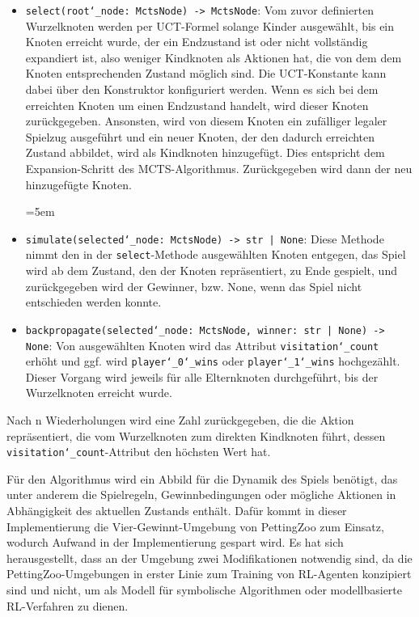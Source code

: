 \begin{itemize}
\item \texttt{select(root\char`_node: MctsNode) -> MctsNode}: Vom zuvor definierten Wurzelknoten werden per UCT-Formel solange Kinder ausgewählt, bis ein Knoten erreicht wurde, der ein Endzustand ist oder nicht vollständig expandiert ist, also weniger Kindknoten als Aktionen hat, die von dem dem Knoten entsprechenden Zustand möglich sind. Die UCT-Konstante kann dabei über den Konstruktor konfiguriert werden. Wenn es sich bei dem erreichten Knoten um einen Endzustand handelt, wird dieser Knoten zurückgegeben. Ansonsten, wird von diesem Knoten ein zufälliger legaler Spielzug ausgeführt und ein neuer Knoten, der den dadurch erreichten Zustand abbildet, wird als Kindknoten hinzugefügt. Dies entspricht dem Expansion-Schritt des MCTS-Algorithmus. Zurückgegeben wird dann der neu hinzugefügte Knoten.

\begingroup
\emergencystretch=5em
\item \texttt{simulate(selected\char`_node: MctsNode) -> str | None}: Diese Methode nimmt den in der \texttt{select}-Methode ausgewählten Knoten entgegen, das Spiel wird ab dem Zustand, den der Knoten repräsentiert, zu Ende gespielt, und zurückgegeben wird der Gewinner, bzw. None, wenn das Spiel nicht entschieden werden konnte.
\item \texttt{backpropagate(selected\char`_node: MctsNode, winner: str | None) -> None}: Von ausgewählten Knoten wird das Attribut \texttt{visitation\char`_count} erhöht und ggf. wird \texttt{player\char`_0\char`_wins} oder \texttt{player\char`_1\char`_wins} hochgezählt. Dieser Vorgang wird jeweils für alle Elternknoten durchgeführt, bis der Wurzelknoten erreicht wurde.

\endgroup
\end{itemize}

Nach n Wiederholungen wird eine Zahl zurückgegeben, die die Aktion repräsentiert, die vom Wurzelknoten zum direkten Kindknoten führt, dessen \texttt{visitation\char`_count}-At\-tribut den höchsten Wert hat.


Für den Algorithmus wird ein Abbild für die Dynamik des Spiels benötigt, das unter anderem die Spielregeln, Gewinnbedingungen oder mögliche Aktionen in Abhängigkeit des aktuellen Zustands enthält. Dafür kommt in dieser Implementierung die Vier-Gewinnt-Umgebung von PettingZoo zum Einsatz, wodurch Aufwand in der Implementierung gespart wird. Es hat sich herausgestellt, dass an der Umgebung zwei Modifikationen notwendig sind, da die PettingZoo-Umgebungen in erster Linie zum Training von RL-Agenten konzipiert sind und nicht, um als Modell für symbolische Algorithmen oder modellbasierte RL-Verfahren zu dienen.


